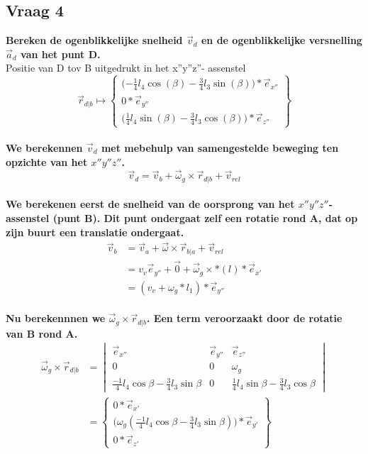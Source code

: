 \documentclass[a4paper,10pt]{article}
\begin{document}
\subsection{Vraag 4}
\textbf{Bereken de ogenblikkelijke snelheid $\vec{v}_d$ en de ogenblikkelijke versnelling $\vec{a}_d$ van het punt D.}\\
Positie van D tov B uitgedrukt in het x''y''z''- assenstel\\
\begin{equation}
	\vec{r}_{d|b} \mapsto \begin{Bmatrix}
	\Big({-\frac{1}{4}} l_4 \cos(\beta)-\frac{3}{4} l_3 \sin(\beta)\Big)*\vec{e}_{x''}\\
	0 * \vec{e}_{y''}\\
	\Big (\frac{1}{4} l_4 \sin(\beta) - \frac{3}{4} l_3 \cos(\beta)\Big) * \vec{e}_{z''}
	\end{Bmatrix}
\end{equation}\\
\textbf{We berekennen $\vec{v}_d$ met mebehulp van samengestelde beweging ten opzichte van het $x''y''z''$.}\\
\begin{equation}
\label{vd}
\vec{v}_d = \vec{v}_b + \vec{\omega}_g \times \vec{r}_{d|b}  +\vec{v}_{rel}
\end{equation}\\
\textbf{We berekenen eerst de snelheid van de oorsprong van het $x''y''z''$-assenstel (punt B). Dit punt ondergaat zelf een rotatie rond A, dat op zijn buurt een translatie ondergaat.}\\
\begin{equation}
\label{vb}
\begin{aligned}
\vec{v}_b &= \vec{v}_a + \vec{\omega}\times\vec{r}_{b|a} + \vec{v}_{rel}\\
&= v_v  \vec{e}_{y''} + \vec{0} + \vec{\omega}_g \times * (l) *\vec{e}_{x'}\\
&= (v_v + \omega_g * l_1)*\vec{e}_{y''}
\end{aligned}
\end{equation}\\
\textbf{Nu berekennnen we $\vec{\omega}_g \times \vec{r}_{d|b}$. Een term veroorzaakt door de rotatie van B rond A. }
\begin{equation}
\label{wrd}
\begin{aligned}
\vec{\omega}_g \times \vec{r}_{d|b} & = \begin{vmatrix}
\vec{e}_{x''}& \vec{e}_{y''} & \vec{e}_{z''}\\
0 & 0 & \omega_g \\
\frac{-1}{4} l_4 \cos{\beta} - \frac{3}{4} l_3  \sin{\beta} & 0 &\frac{1}{4} l_4  \sin{\beta}-\frac{3}{4} l_3  \cos{\beta}
\end{vmatrix}\\
&= \begin{Bmatrix}
0 *\vec{e}_{x'}\\
\Big(\omega_g (\frac{-1}{4} l_4 \cos{\beta}-\frac{3}{4} l_3 \sin{\beta})\Big)*\vec{e}_{y'}\\
0 * \vec{e}_{z'}
\end{Bmatrix}
\end{aligned}
\end{equation}\\
\end{document}
